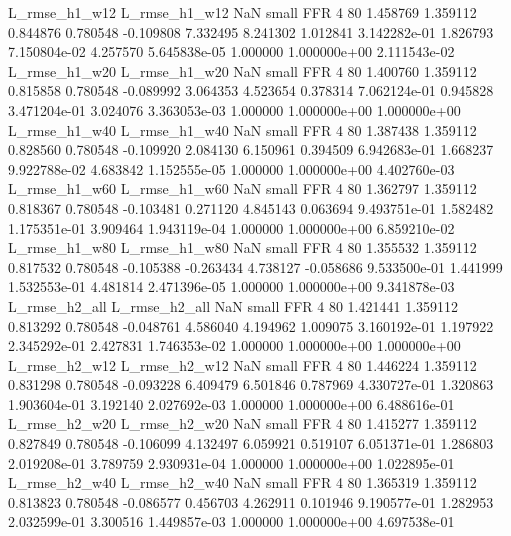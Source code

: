  L_rmse_h1_w12  L_rmse_h1_w12                   NaN      small      FFR                 4 80 1.458769       1.359112 0.844876       0.780548   -0.109808      7.332495      8.241302     1.012841   3.142282e-01  1.826793 7.150804e-02     4.257570   5.645838e-05            1.000000    1.000000e+00        2.111543e-02
 L_rmse_h1_w20  L_rmse_h1_w20                   NaN      small      FFR                 4 80 1.400760       1.359112 0.815858       0.780548   -0.089992      3.064353      4.523654     0.378314   7.062124e-01  0.945828 3.471204e-01     3.024076   3.363053e-03            1.000000    1.000000e+00        1.000000e+00
 L_rmse_h1_w40  L_rmse_h1_w40                   NaN      small      FFR                 4 80 1.387438       1.359112 0.828560       0.780548   -0.109920      2.084130      6.150961     0.394509   6.942683e-01  1.668237 9.922788e-02     4.683842   1.152555e-05            1.000000    1.000000e+00        4.402760e-03
 L_rmse_h1_w60  L_rmse_h1_w60                   NaN      small      FFR                 4 80 1.362797       1.359112 0.818367       0.780548   -0.103481      0.271120      4.845143     0.063694   9.493751e-01  1.582482 1.175351e-01     3.909464   1.943119e-04            1.000000    1.000000e+00        6.859210e-02
 L_rmse_h1_w80  L_rmse_h1_w80                   NaN      small      FFR                 4 80 1.355532       1.359112 0.817532       0.780548   -0.105388     -0.263434      4.738127    -0.058686   9.533500e-01  1.441999 1.532553e-01     4.481814   2.471396e-05            1.000000    1.000000e+00        9.341878e-03
 L_rmse_h2_all  L_rmse_h2_all                   NaN      small      FFR                 4 80 1.421441       1.359112 0.813292       0.780548   -0.048761      4.586040      4.194962     1.009075   3.160192e-01  1.197922 2.345292e-01     2.427831   1.746353e-02            1.000000    1.000000e+00        1.000000e+00
 L_rmse_h2_w12  L_rmse_h2_w12                   NaN      small      FFR                 4 80 1.446224       1.359112 0.831298       0.780548   -0.093228      6.409479      6.501846     0.787969   4.330727e-01  1.320863 1.903604e-01     3.192140   2.027692e-03            1.000000    1.000000e+00        6.488616e-01
 L_rmse_h2_w20  L_rmse_h2_w20                   NaN      small      FFR                 4 80 1.415277       1.359112 0.827849       0.780548   -0.106099      4.132497      6.059921     0.519107   6.051371e-01  1.286803 2.019208e-01     3.789759   2.930931e-04            1.000000    1.000000e+00        1.022895e-01
 L_rmse_h2_w40  L_rmse_h2_w40                   NaN      small      FFR                 4 80 1.365319       1.359112 0.813823       0.780548   -0.086577      0.456703      4.262911     0.101946   9.190577e-01  1.282953 2.032599e-01     3.300516   1.449857e-03            1.000000    1.000000e+00        4.697538e-01
